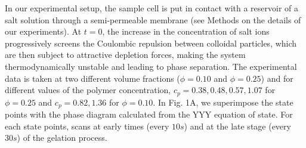 \documentclass[12pt]{article}
\begin{document}
In our experimental setup, the sample cell is put in contact with a reservoir of a salt solution through a semi-permeable membrane (see Methods 
on the details of our experiments).
At $t=0$, the increase in the concentration of salt ions progressively screens the Coulombic repulsion between colloidal particles,
which are then subject to attractive depletion forces, making the system thermodynamically unstable and leading to phase separation. 
The experimental data is taken at two different volume fractions ($\phi=0.10$ and $\phi=0.25$) and for different values
of the polymer concentration, $c_p=0.38,0.48,0.57,1.07$ for $\phi=0.25$ and $c_p=0.82,1.36$ for $\phi=0.10$.
In Fig. 1A, we superimpose the state points with the phase diagram calculated from the YYY equation of state.
For each state points, scans at early times (every $10s$) and at the late stage (every $30s$) of the gelation process. 
\end{document}
